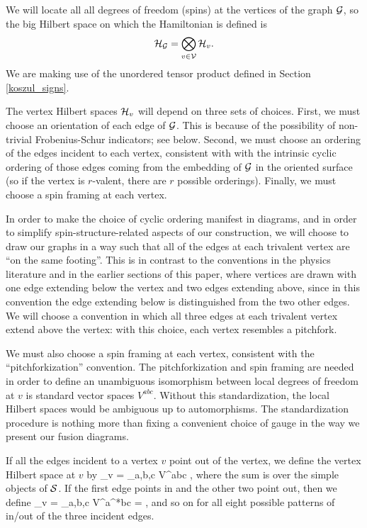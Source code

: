 We will locate all all degrees of freedom (spins) at the vertices of the graph $\mathcal{G}$, so
the big Hilbert space on which the Hamiltonian is defined is
\begin{align}	\label{GraphHilbertSpace}
 \mathcal{H}_{\mathcal{G}} =\bigotimes_{v \in \mathcal{V}} \mathcal{H}_v. 
\end{align}
We are making use of the unordered tensor product defined in Section \ref{koszul_signs}.

The vertex Hilbert spaces $\mathcal{H}_{v}$ will depend on three sets of choices.
First, we must choose an orientation of each edge of $\mathcal{G}$.
This is because of the possibility of non-trivial Frobenius-Schur indicators; see below.
Second, we must choose an ordering of the edges incident to each vertex, consistent with with the intrinsic cyclic ordering of those edges
coming from the embedding of $\mathcal{G}$ in the oriented surface
(so if the vertex is $r$-valent, there are $r$ possible orderings).
Finally, we must choose a spin framing at each vertex.

In order to make the choice of cyclic ordering manifest in diagrams, and in order to simplify spin-structure-related
aspects of our construction, we will choose to draw our graphs in a way such that all of the 
edges at each trivalent vertex are ``on the same footing''. This is in contrast to the conventions in the physics literature
and in the earlier sections of this paper, where vertices are drawn with one edge extending below the vertex and two 
edges extending above, since in this convention the edge extending below is distinguished from the two other edges.
We will choose a convention in which all three edges at each trivalent vertex extend above the vertex: with this
choice, each vertex resembles a pitchfork. 

We must also choose a spin framing at each vertex, consistent with the ``pitchforkization'' convention.
The pitchforkization and spin framing are needed in order to define an unambiguous
isomorphism between local degrees of freedom at $v$ is standard vector spaces $V^{abc}$.
Without this standardization, the local Hilbert spaces would be ambiguous up to automorphisms. 
The standardization procedure is nothing more than fixing a convenient choice of gauge in the way we present our fusion diagrams. 

If all the edges incident to a vertex $v$ point out of the vertex, we define the vertex Hilbert space at $v$ by 
\be
	\mch_v = \bigoplus_{a,b,c} V^{abc}  \quad\quad\quad\quad\quad\quad {},
	\label{pitchfork_basis}
\ee
where the sum is over the simple objects of $\mathcal{S}$.
If the first edge points in and the other two point out, then we define
\be
	\mch_v = \bigoplus_{a,b,c} V^{a^*bc}  \quad\quad\quad\quad\quad\quad {} =  ,
\ee
and so on for all eight possible patterns of in/out of the three incident edges.

